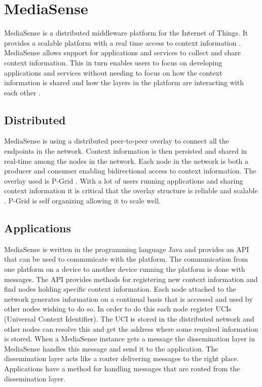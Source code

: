\section{MediaSense}
MediaSense is a distributed middleware platform for the Internet of Things. It provides a scalable platform with a real time access to context information \cite{Kanter539187}. MediaSense allows support for applications and services to collect and share context information. This in turn enables users to focus on developing applications and services without needing to focus on how the context information is shared and how the layers in the platform are interacting with each other \cite{Walters413794}. 

\subsection{Distributed}
MediaSense is using a distributed peer-to-peer overlay to connect all the endpoints in the network. Context information is then persisted and shared in real-time among the nodes in the network. Each node in the network is both a producer and consumer enabling bidirectional access to context information. The overlay used is P-Grid \cite{aberer2003p}. With a lot of users running applications and sharing context information it is critical that the overlay structure is reliable and scalable \cite{aberer2003p}. P-Grid is self organizing allowing it to scale well. 

\subsection{Applications}
MediaSense is written in the programming language Java and provides an API that can be used to communicate with the platform. The communication from one platform on a device to another device running the platform is done with messages. The API provides methods for registering new context information and find nodes holding specific context information. Each node attached to the network generates information on a continual basis that is accessed and used by other nodes wishing to do so. In order to do this each node register UCIs (Universal Context Identifier). The UCI is stored in the distributed network and other nodes can resolve this and get the address where some required information is stored. When a MediaSense instance gets a message the dissemination layer in MediaSense handles this message and send it to the application. The dissemination layer acts like a router delivering messages to the right place. Applications have a method for handling messages that are routed from the dissemination layer. 


